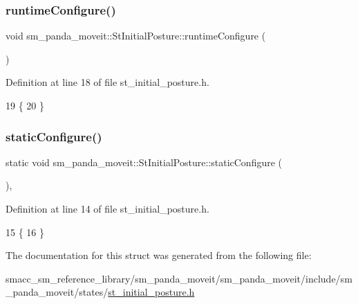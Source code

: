 \subsubsection{\texorpdfstring{runtime\+Configure()}{runtimeConfigure()}}
{\footnotesize\ttfamily void sm\+\_\+panda\+\_\+moveit\+::\+St\+Initial\+Posture\+::runtime\+Configure (\begin{DoxyParamCaption}{ }\end{DoxyParamCaption})\hspace{0.3cm}{\ttfamily [inline]}}



Definition at line 18 of file st\+\_\+initial\+\_\+posture.\+h.


\begin{DoxyCode}
19     \{
20     \}
\end{DoxyCode}
\mbox{\label{structsm__panda__moveit_1_1StInitialPosture_a8b2efaff20ee8fd624bb0d7b29b124b4}} 
\subsubsection{\texorpdfstring{static\+Configure()}{staticConfigure()}}
{\footnotesize\ttfamily static void sm\+\_\+panda\+\_\+moveit\+::\+St\+Initial\+Posture\+::static\+Configure (\begin{DoxyParamCaption}{ }\end{DoxyParamCaption})\hspace{0.3cm}{\ttfamily [inline]}, {\ttfamily [static]}}



Definition at line 14 of file st\+\_\+initial\+\_\+posture.\+h.


\begin{DoxyCode}
15     \{
16     \}
\end{DoxyCode}


The documentation for this struct was generated from the following file\+:\begin{DoxyCompactItemize}
\item 
smacc\+\_\+sm\+\_\+reference\+\_\+library/sm\+\_\+panda\+\_\+moveit/sm\+\_\+panda\+\_\+moveit/include/sm\+\_\+panda\+\_\+moveit/states/\hyperlink{sm__panda__moveit_2sm__panda__moveit_2include_2sm__panda__moveit_2states_2st__initial__posture_8h}{st\+\_\+initial\+\_\+posture.\+h}\end{DoxyCompactItemize}
